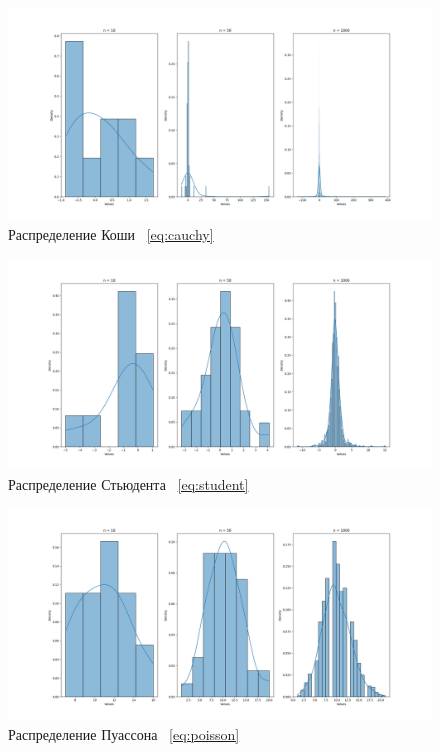 \documentclass[12pt,a4paper]{article}
\begin{document}
	\begin{figure}[h!]
		\begin{center}
			\includegraphics[width = 1.12\linewidth]{graphics/cauchy.png}
			\caption{Распределение Коши \ \eqref{eq:cauchy}}
		\end{center}
	\end{figure}

	\newpage

	\begin{figure}[h!]
		\begin{center}
			\includegraphics[width = 1.12\linewidth]{graphics/student.png}
			\caption{Распределение Стьюдента \ \eqref{eq:student}}
		\end{center}
	\end{figure}

	\begin{figure}[h!]
		\begin{center}
			\includegraphics[width = 1.12\linewidth]{graphics/poisson.png}
			\caption{Распределение Пуассона \ \eqref{eq:poisson}}
		\end{center}
	\end{figure}
\end{document}

